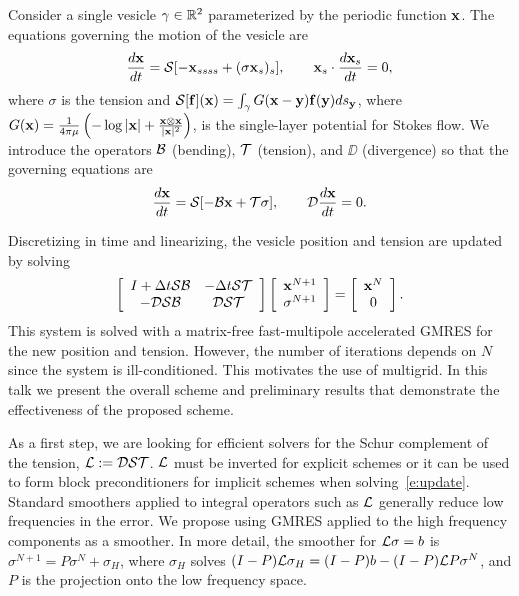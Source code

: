 \documentclass{report}
\begin{document}
Consider a single vesicle $\gamma \in {\mathbb{R}}^{2}$ parameterized by the
periodic function ${\mathbf{x}}$. The equations governing the motion of the
vesicle are
\begin{align*}
\frac{d{\mathbf{x}}}{dt} = {\mathcal{S}}[-{\mathbf{x}}_{ssss}+(\sigma {\mathbf{x}}_{s})_{s}],
\hspace{20pt} {\mathbf{x}}_{s} \cdot \frac{d{\mathbf{x}}_{s}}{dt} = 0,
\end{align*}
where $\sigma$ is the tension and ${\mathcal{S}}[{\mathbf{f}}]({\mathbf{x}}) =
\int_{\gamma}G({\mathbf{x}}-{\mathbf{y}}){\mathbf{f}}({\mathbf{y}})ds_{{\mathbf{y}}}$, where $G({\mathbf{x}}) =
\frac{1}{4\pi\mu}\left(-\log|{\mathbf{x}}| + \frac{{\mathbf{x}} \otimes
{\mathbf{x}}}{|{\mathbf{x}}|^{2}}\right)$, is the single-layer potential for Stokes flow.
We introduce the operators ${\mathcal{B}}$ (bending), ${\mathcal{T}}$ (tension), and $\DD$
(divergence) so that the governing equations are
\begin{align*}
\frac{d{\mathbf{x}}}{dt} = {\mathcal{S}}[-{\mathcal{B}}{\mathbf{x}}+{\mathcal{T}}\sigma], \hspace{20pt}
{\mathcal{D}}\frac{d{\mathbf{x}}}{dt} = 0.
\end{align*}

Discretizing in time and linearizing, the vesicle position and tension
are updated by solving
\begin{align}
\left[ \begin{array}{cc}
I + \Delta t {\mathcal{S}}{\mathcal{B}} & -\Delta t {\mathcal{S}}{\mathcal{T}} \\
-{\mathcal{D}}{\mathcal{S}}{\mathcal{B}} & {\mathcal{D}}{\mathcal{S}}{\mathcal{T}}
\end{array} \right]
\left[ \begin{array}{c}
{\mathbf{x}}^{N+1} \\ \sigma^{N+1}
\end{array} \right] =
\left[ \begin{array}{c}
{\mathbf{x}}^{N} \\ 0
\end{array} \right].
\label{e:update}
\end{align}
This system is solved with a matrix-free fast-multipole accelerated GMRES
for the new position and tension. However, the number of iterations
depends on $N$ since the system is ill-conditioned. This motivates the
use of multigrid. In this talk we present the overall scheme and
preliminary results that demonstrate the effectiveness of the proposed
scheme.

As a first step, we are looking for efficient solvers for the Schur
complement of the tension, ${\mathcal{L}}:={\mathcal{D}}{\mathcal{S}}{\mathcal{T}}$. ${\mathcal{L}}$ must be inverted for
explicit schemes or it can be used to form block preconditioners for
implicit schemes when solving~\eqref{e:update}. Standard smoothers
applied to integral operators such as ${\mathcal{L}}$ generally reduce low
frequencies in the error. We propose using GMRES applied to the high
frequency components as a smoother. In more detail, the smoother for ${\mathcal{L}}
\sigma = b$ is $ \sigma^{N+1} = P \sigma^{N} +
\sigma_{H}$, where $\sigma_{H}$ solves $(I-P) {\mathcal{L}} \sigma_{H} = (I-P) b -
(I-P){\mathcal{L}} P\sigma^{N}$, and $P$ is the projection onto the low frequency
space.
\end{document}
